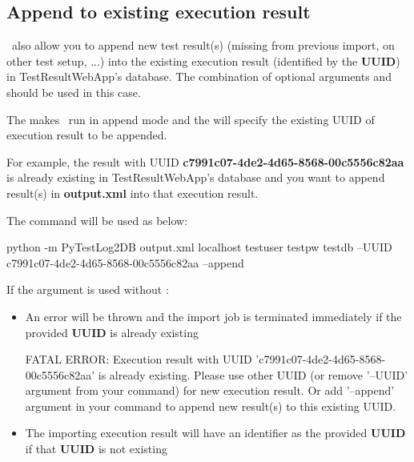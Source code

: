 \hypertarget{append-to-existing-execution-result}{%
\subsection{Append to existing execution result}\label{append-to-existing-execution-result}}

\pkg\ also allow you to append new test result(s) (missing from
previous import, on other test setup, ...) into the existing execution
result (identified by the \textbf{UUID}) in TestResultWebApp's database. 
The combination of optional arguments  and  
should be used in this case.

The  makes \pkg\ run in append mode and the  
will specify the existing UUID of execution result to be appended.

For example, the result with UUID
\textbf{c7991c07-4de2-4d65-8568-00c5556c82aa} is already existing in
TestResultWebApp's database and you want to append
result(s) in \textbf{output.xml} into that execution result.

The command will be used as below:

\begin{robotlog}
python -m PyTestLog2DB output.xml localhost testuser testpw testdb --UUID c7991c07-4de2-4d65-8568-00c5556c82aa --append
\end{robotlog}

If the argument  is used without :

\begin{itemize}
\item
  An error will be thrown and the import job is terminated immediately
  if the provided \textbf{UUID} is already existing

\begin{robotlog}
FATAL ERROR: Execution result with UUID 'c7991c07-4de2-4d65-8568-00c5556c82aa' is already existing.
             Please use other UUID (or remove '--UUID' argument from your command) for new execution result.
             Or add '--append' argument in your command to append new result(s) to this existing UUID.
\end{robotlog}
\item
  The importing execution result will have an identifier as the provided
  \textbf{UUID} if that \textbf{UUID} is not existing
\end{itemize}

